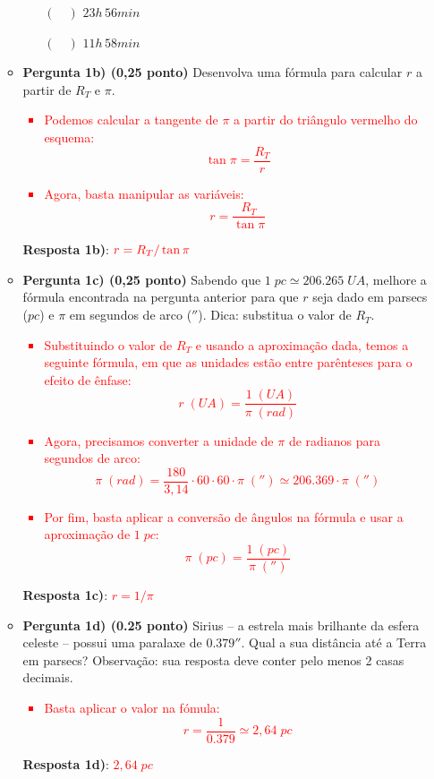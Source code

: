 \documentclass[a4paper, 12pt]{article}
\begin{document}
\begin{flushleft}
\begin{itemize}
\begin{itemize}
\begin{itemize}
						\item[$(\quad)$] $23h \, 56min$
						\item[$(\quad)$] $11h \, 58min$
					\end{itemize}
				\item \textbf{Pergunta 1b) (0,25 ponto)} Desenvolva uma fórmula para calcular $r$ a partir de $R_T$ e $\pi$.
					\textcolor{red}{\begin{itemize}
						\item Podemos calcular a tangente de $\pi$ a partir do triângulo vermelho do esquema:
							$$\tan \pi = \frac{R_T}{r}$$
						\item Agora, basta manipular as variáveis:
							$$r = \frac{R_T}{\tan \pi}$$
					\end{itemize}}
					\textbf{Resposta 1b)}: $\textcolor{red}{r = R_T / \tan \pi}$
				\item \textbf{Pergunta 1c) (0,25 ponto)} Sabendo que $1 \; pc \simeq 206.265 \; UA$, melhore a fórmula encontrada na pergunta anterior para que $r$ seja dado em parsecs ($pc$) e $\pi$ em segundos de arco ($''$). \linebreak
					Dica: substitua o valor de $R_T$.
					\textcolor{red}{\begin{itemize}
						\item Substituindo o valor de $R_T$ e usando a aproximação dada, temos a seguinte fórmula, em que as unidades estão entre parênteses para o efeito de ênfase:
							$$r \; (UA) = \frac{1 \; (UA)}{\pi \; (rad)}$$
						\item Agora, precisamos converter a unidade de $\pi$ de radianos para segundos de arco:
							$$\pi \; (rad) = \frac{180}{3,14} \cdot 60 \cdot 60 \cdot \pi \; ('') \simeq 206.369 \cdot \pi \; ('') $$
						\item Por fim, basta aplicar a conversão de ângulos na fórmula e usar a aproximação de $1 \; pc$:
							$$\pi \; (pc) = \frac{1 \; (pc)}{\pi \; ('')}$$
					\end{itemize}}
					\textbf{Resposta 1c)}: \textcolor{red}{$r = 1 / \pi$}
				\item \textbf{Pergunta 1d) (0.25 ponto)} Sirius -- a estrela mais brilhante da esfera celeste -- possui uma paralaxe de $0.379''$. Qual a sua distância até a Terra em parsecs? \linebreak
					Observação: sua resposta deve conter pelo menos 2 casas decimais.
					\textcolor{red}{\begin{itemize}
						\item Basta aplicar o valor na fómula:
							$$r = \frac{1}{0.379} \simeq 2,64 \; pc$$
					\end{itemize}}
					\textbf{Resposta 1d)}: \textcolor{red}{$2,64 \; pc$}
			\end{itemize}
			

\end{itemize}
\end{flushleft}
\end{document}
